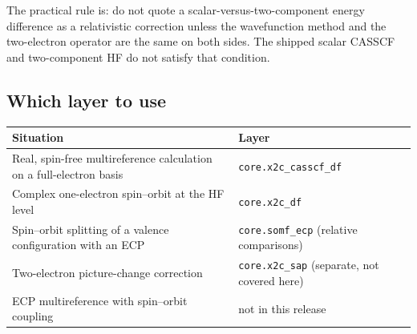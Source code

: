 The practical rule is: do not quote a scalar-versus-two-component
energy difference as a relativistic correction unless the wavefunction
method and the two-electron operator are the same on both sides.  The
shipped scalar CASSCF and two-component HF do not satisfy that
condition.

\subsection{Which layer to use}

\begin{center}
\small
\begin{tabularx}{\textwidth}{>{\raggedright\arraybackslash}p{}X}
\toprule
Situation & Layer \\
\midrule
Real, spin-free multireference calculation on a full-electron basis &
  \texttt{core.x2c\_casscf\_df} \\
Complex one-electron spin--orbit at the HF level &
  \texttt{core.x2c\_df} \\
Spin--orbit splitting of a valence configuration with an ECP &
  \texttt{core.somf\_ecp} (relative comparisons) \\
Two-electron picture-change correction &
  \texttt{core.x2c\_sap} (separate, not covered here) \\
ECP multireference with spin--orbit coupling &
  not in this release \\
\bottomrule
\end{tabularx}
\end{center}

